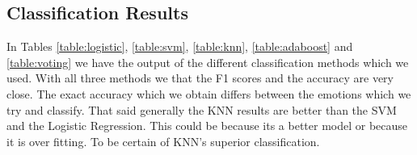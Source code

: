 
\subsection{Classification Results}
In Tables \ref{table:logistic}, \ref{table:svm}, \ref{table:knn}, \ref{table:adaboost} and \ref{table:voting}
we have the output of the different classification methods which we used.
With all three methods we that the F1 scores and the accuracy are very close.
The exact accuracy which we obtain differs between the emotions which we try and classify.
That said generally the KNN results are better than the SVM and the Logistic Regression.
This could be because its a better model or because it is over fitting.
To be certain of KNN's superior classification.
